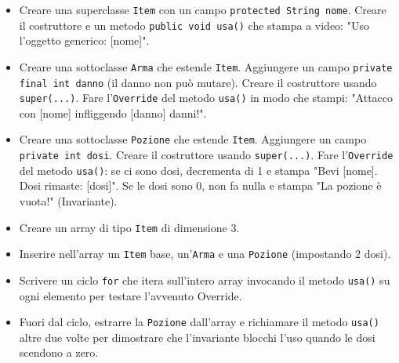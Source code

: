 \documentclass{article}
\begin{document}
\begin{itemize}
    \item Creare una superclasse \texttt{Item} con un campo \texttt{protected String nome}. Creare il costruttore e un metodo \texttt{public void usa()} che stampa a video: "Uso l'oggetto generico: [nome]".
    \item Creare una sottoclasse \texttt{Arma} che estende \texttt{Item}. Aggiungere un campo \texttt{private final int danno} (il danno non può mutare). Creare il costruttore usando \texttt{super(...)}. Fare l'\texttt{Override} del metodo \texttt{usa()} in modo che stampi: "Attacco con [nome] infliggendo [danno] danni!".
    \item Creare una sottoclasse \texttt{Pozione} che estende \texttt{Item}. Aggiungere un campo \texttt{private int dosi}. Creare il costruttore usando \texttt{super(...)}. Fare l'\texttt{Override} del metodo \texttt{usa()}: se ci sono dosi, decrementa di 1 e stampa "Bevi [nome]. Dosi rimaste: [dosi]". Se le dosi sono 0, non fa nulla e stampa "La pozione è vuota!" (Invariante).
    \item Creare un array di tipo \texttt{Item} di dimensione 3.
    \item Inserire nell'array un \texttt{Item} base, un'\texttt{Arma} e una \texttt{Pozione} (impostando 2 dosi).
    \item Scrivere un ciclo \texttt{for} che itera sull'intero array invocando il metodo \texttt{usa()} su ogni elemento per testare l'avvenuto Override.
    \item Fuori dal ciclo, estrarre la \texttt{Pozione} dall'array e richiamare il metodo \texttt{usa()} altre due volte per dimostrare che l'invariante blocchi l'uso quando le dosi scendono a zero.
\end{itemize}
\end{document}

